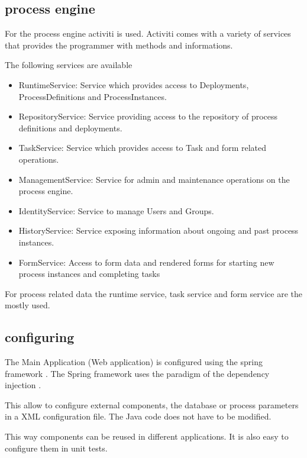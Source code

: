 \documentclass[paper=a4,twoside=false,BCOR=0mm,DIV=calc,fontsize=12pt]{scrartcl}
\begin{document}
\subsection{process engine}
For the process engine activiti is used. Activiti comes with a variety of services that provides the programmer with methods and informations.

The following services are available \cite{activitijavadoc}
\begin{itemize}
 \item RuntimeService: Service which provides access to Deployments, ProcessDefinitions and ProcessInstances. 
 \item RepositoryService: Service providing access to the repository of process definitions and deployments. 
 \item TaskService: Service which provides access to Task and form related operations. 
 \item ManagementService: Service for admin and maintenance operations on the process engine. 
 \item IdentityService: Service to manage Users and Groups. 
 \item HistoryService: Service exposing information about ongoing and past process instances. 
 \item FormService: Access to form data and rendered forms for starting new process instances and completing tasks
\end{itemize}

For process related data the runtime service, task service and form service are the mostly used.


\subsection{configuring}
The Main Application (Web application) is configured using the spring framework \cite{spring}. The Spring framework uses the paradigm of the dependency injection \cite{dependencyInection}.

This allow to configure external components, the database or process parameters in a XML configuration file. The Java code does not have to be modified. 

This way components can be reused in different applications. It is also easy to configure them in unit tests.
\end{document}

